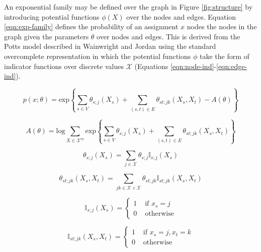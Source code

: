 \documentclass{article} %
\begin{document}
An exponential family may be defined over the graph in Figure
\ref{fig:structure} by introducing potential functions $\phi(X)$ over the nodes
and edges. Equation \ref{eqn:exp-family} defines the probability of an
assignment $x$ nodes the nodes in the graph given the parameters $\theta$ over
nodes and edges. This is derived from the Potts model described in Wainwright
and Jordan \cite{wainwright08} using the standard overcomplete representation
in which the potential functions $\phi$ take the form of indicator functions
over discrete values $\mathcal{X}$ (Equations
\ref{eqn:node-ind}-\ref{eqn:edge-ind}).

\begin{equation}
\label{eqn:exp-family}
p(x;\theta)
=
\textrm{exp}\left\{\sum_{s \in V}\theta_{s;j}(X_s) + \sum_{(s,t) \in E} \theta_{st;jk}(X_s,X_t) - A(\theta)\right\}
\end{equation}

\begin{equation}
\label{eqn:normalization}
A(\theta)
=
\textrm{log} \sum_{X \in \mathcal{X}^m} \textrm{exp}\left\{\sum_{s \in V}\theta_{s;j}(X_s) + \sum_{(s,t) \in E} \theta_{st;jk}(X_s,X_t)\right\}
\end{equation}

\noindent\begin{minipage}{.4\linewidth}
\begin{equation}
\label{eqn:node-theta}
\theta_{s;j}(X_s) = \sum_{j \in \mathcal{X}} \theta_{s;j} \mathbb{I}_{s;j}(X_s)
\end{equation}
\end{minipage}%
\begin{minipage}{.6\linewidth}
\begin{equation}
\label{eqn:edge-theta}
\theta_{st;jk}(X_s,X_t) = \sum_{jk \in \mathcal{X} \times \mathcal{X}} \theta_{st;jk} \mathbb{I}_{st;jk}(X_s,X_t)
\end{equation}
\end{minipage}

\noindent\begin{minipage}{.4\linewidth}
\begin{equation}
\label{eqn:node-ind}
\mathbb{I}_{s;j}(X_s) = \left\{ \begin{array}{rl}
 1 &\mbox{ if $x_s = j$} \\
 0 &\mbox{ otherwise}
\end{array} \right.
\end{equation}
\end{minipage}%
\begin{minipage}{.6\linewidth}
\begin{equation}
\label{eqn:edge-ind}
\mathbb{I}_{st;jk}(X_s,X_t) = \left\{ \begin{array}{rr}
 1 &\mbox{ if $x_s = j, x_t = k$} \\
 0 &\mbox{ otherwise}
\end{array} \right.
\end{equation}
\end{minipage}
\end{document}
